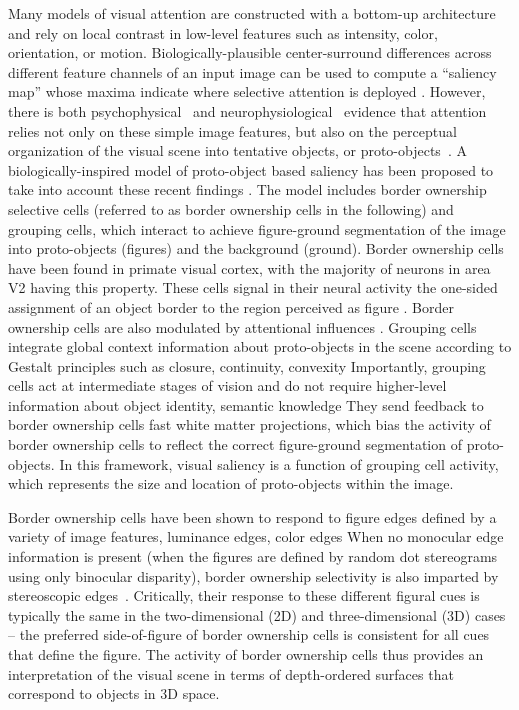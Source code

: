 Many models of visual attention are constructed with a bottom-up architecture and rely on local contrast in low-level features such as
intensity, color, orientation, or motion. Biologically-plausible
center-surround differences across different feature channels of an input image can be used to compute a ``saliency map'' whose maxima
indicate where selective attention is deployed \citep{Koch_Ullman85,Niebur_Koch96b,Itti_etal98a}. However, there is
both psychophysical~\citep{Einhauser_etal08a} and neurophysiological~\citep{Zhou_etal00, Qiu_etal07} evidence that attention relies not only on these simple image features, but also on
the perceptual organization of the visual scene into tentative objects, or proto-objects~\citep{Rensink00a}. A biologically-inspired model of proto-object based saliency has been proposed to take into account these recent findings \citep{Craft_etal07,Mihalas_etal11b,Russell_etal14}. The model includes border ownership selective cells (referred to as border ownership cells in the following) and grouping cells, which interact to achieve figure-ground segmentation of the image into proto-objects (figures) and the background (ground). Border ownership cells have been found in primate visual cortex, with the majority of neurons in area V2 having this property. These cells signal in their neural activity the one-sided assignment of an object border to the region perceived as figure \citep{Zhou_etal00}.  Border ownership cells are also modulated by attentional influences \citep{Qiu_etal07}. Grouping cells integrate global context information about proto-objects in the scene according to Gestalt principles such as closure, continuity, convexity \etc Importantly, grouping cells act at intermediate stages of vision and do not require higher-level information about object identity, semantic knowledge \etc They send feedback to border ownership cells \via fast white matter projections, which bias the activity of border ownership cells to reflect the correct figure-ground segmentation of proto-objects. In this framework, visual saliency is a function of grouping cell activity, which represents the size and location of proto-objects within the image.

Border ownership cells have been shown to respond to figure edges defined by a variety of image features, \eg luminance edges, color
edges \etc When no monocular edge information is present (\ie when the
figures are defined by random dot stereograms using only binocular
disparity), border ownership selectivity is also imparted by stereoscopic edges~\citep{Qiu_vonderHeydt05}. Critically, their response to these different figural cues is typically the same in the two-dimensional (2D) and three-dimensional (3D) cases -- the preferred side-of-figure of border ownership cells is consistent for all cues that define the figure. The activity of border ownership cells thus provides an interpretation of the visual scene in terms of depth-ordered surfaces that correspond to objects in 3D space. 

